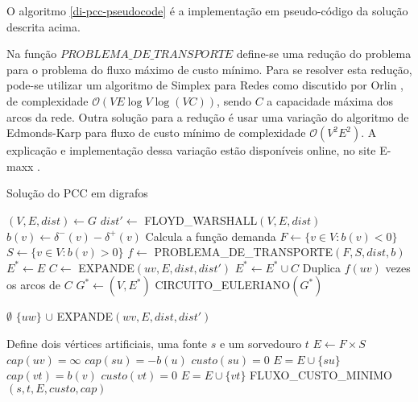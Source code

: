     O algoritmo \ref{di-pcc-pseudocode} é a implementação em pseudo-código da solução descrita acima.

    Na função $PROBLEMA\_DE\_TRANSPORTE$ define-se uma redução do problema para o problema do fluxo máximo de custo mínimo. 
    Para se resolver esta redução, pode-se utilizar um algoritmo de Simplex para Redes como discutido por Orlin \cite{network-simplex}, de complexidade $\mathcal{O}(VE\log V\log(VC))$, sendo $C$ a capacidade máxima dos arcos da rede. 
    Outra solução para a redução é usar uma variação do algoritmo de Edmonds-Karp \cite{edmonds-karp} para fluxo de custo mínimo de complexidade $\mathcal{O}(V^2E^2)$. 
    A explicação e implementação dessa variação estão disponíveis online, no site E-maxx \cite{min-cost}. 

    \begin{algorithm}
        \caption{Solução do PCC em digrafos}
        \label{di-pcc-pseudocode}
        \begin{algorithmic}[1]
        \State $(V, E, dist) \gets G$
        \State $dist' \gets $ FLOYD\_WARSHALL$(V, E, dist)$
            \State $b(v) \gets \delta^-(v) - \delta^+(v)$ \Comment Calcula a função demanda
        \EndFor
        \State $F \gets \{v \in V : b(v) < 0\}$
        \State $S \gets \{v \in V : b(v) > 0\}$
        \State $f \gets $ PROBLEMA\_DE\_TRANSPORTE$(F, S, dist, b)$
        \State $E^* \gets E$ 
            \State $C \gets$ EXPANDE$(uv, E, dist, dist')$
                \State $E^* \gets E^* \cup C$ \Comment Duplica $f(uv)$ vezes os arcos de $C$ 
            \EndFor
        \EndFor
        \State $G^* \gets (V, E^*)$
        \State \Return CIRCUITO\_EULERIANO$(G^*)$
        \EndFunction 

        \Return $\emptyset$
        \EndIf
            \State \Return $\{uw\}$  $\cup$ EXPANDE$(wv, E, dist, dist')$
            \EndIf
        \EndFor
        \EndFunction

            \State Define dois vértices artificiais, uma fonte $s$ e um sorvedouro $t$
            \State $E \gets F\times S$
                \State $cap(uv) = \infty$
            \EndFor
                \State $cap(su) = -b(u)$
                \State $custo(su) = 0$
                \State $E = E \cup \{su\}$
            \EndFor
                \State $cap(vt) = b(v)$
                \State $custo(vt) = 0$
                \State $E = E \cup \{vt\}$
            \EndFor
            \State \Return FLUXO\_CUSTO\_MINIMO$(s, t, E, custo, cap)$
        \EndFunction
        \end{algorithmic}
    \end{algorithm}

